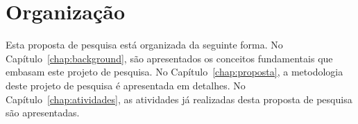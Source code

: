 







\section{Organização}

Esta proposta de pesquisa está organizada da seguinte forma.
No Capítulo~\ref{chap:background}, são apresentados os conceitos fundamentais que embasam este projeto de pesquisa.
No Capítulo~\ref{chap:proposta}, a metodologia deste projeto de pesquisa é apresentada em detalhes. 
No Capítulo~\ref{chap:atividades}, as atividades já realizadas desta proposta de pesquisa são apresentadas.


